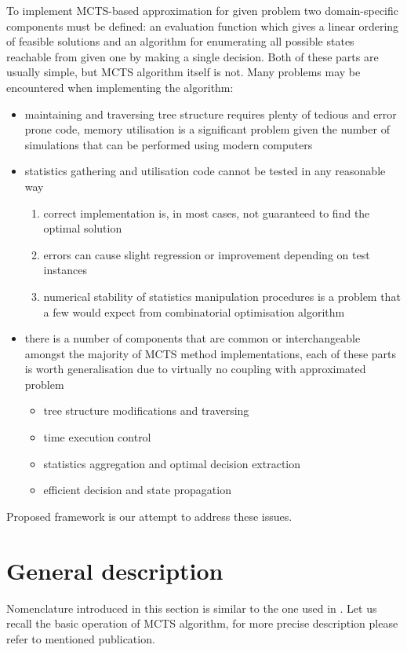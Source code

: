 To implement MCTS-based approximation for given problem two domain-specific
components must be defined: an evaluation function which gives a linear ordering
of feasible solutions and an algorithm for enumerating all possible states
reachable from given one by making a single decision.
Both of these parts are usually simple, but MCTS algorithm itself is not. Many
problems may be encountered when implementing the algorithm:
\begin{itemize}
  \item maintaining and traversing tree structure requires plenty of tedious
    and error prone code, memory utilisation is a significant problem given the
    number of simulations that can be performed using modern computers
  \item statistics gathering and utilisation code cannot be tested in any reasonable way
    \begin{enumerate}
      \item correct implementation is, in most cases, not guaranteed to find the optimal solution
      \item errors can cause slight regression or improvement depending on test instances
      \item numerical stability of statistics manipulation procedures is a
      problem that a few would expect from combinatorial optimisation algorithm
    \end{enumerate}
  \item there is a number of components that are common or interchangeable
    amongst the majority of MCTS method implementations, each of these parts is
    worth generalisation due to virtually no coupling with approximated problem
    \begin{itemize}
      \item tree structure modifications and traversing
      \item time execution control
      \item statistics aggregation and optimal decision extraction
      \item efficient decision and state propagation
    \end{itemize}
\end{itemize}

Proposed framework is our attempt to address these issues.

\section{General description}
Nomenclature introduced in this section is similar to the one used in
\cite{MCTSsurvey}.  Let us recall the basic operation of MCTS algorithm, for
more precise description please refer to mentioned publication.

